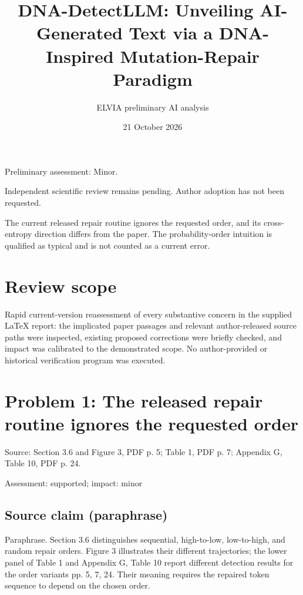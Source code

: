 \documentclass[11pt]{article}
\begin{document}
\title{DNA-DetectLLM: Unveiling AI-Generated Text via a DNA-Inspired Mutation-Repair Paradigm}

\author{ELVIA preliminary AI analysis}\date{21 October 2026}\maketitle

Preliminary assessment: Minor.\par

Independent scientific review remains pending. Author adoption has not been requested.

The current released repair routine ignores the requested order, and its cross-entropy direction differs from the paper. The probability-order intuition is qualified as typical and is not counted as a current error.

\section*{Review scope}

Rapid current-version reassessment of every substantive concern in the supplied LaTeX report: the implicated paper passages and relevant author-released source paths were inspected, existing proposed corrections were briefly checked, and impact was calibrated to the demonstrated scope. No author-provided or historical verification program was executed.

\section*{Problem 1: The released repair routine ignores the requested order}

Source: Section 3.6 and Figure 3, PDF p. 5; Table 1, PDF p. 7; Appendix G, Table 10, PDF p. 24.

Assessment: supported; impact: minor

\subsection*{Source claim (paraphrase)}

Paraphrase. Section 3.6 distinguishes sequential, high-to-low, low-to-high, and random repair orders. Figure 3 illustrates their different trajectories; the lower panel of Table 1 and Appendix G, Table 10 report different detection results for the order variants pp. 5, 7, 24. Their meaning requires the repaired token sequence to depend on the chosen order.
\end{document}
